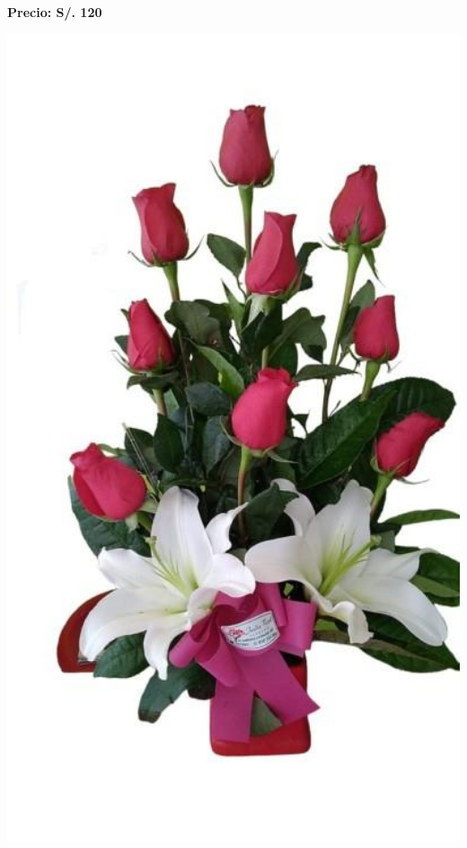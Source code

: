 \documentclass{article}
\begin{document}
\vspace{0.3cm}
\begin{center}
   \textbf{\Large Precio: \textcolor{cpred}{S/. 120 }}
\end{center}
\vspace{1cm}
\noindent
\begin{minipage}{0.35\textwidth}
    \includegraphics[width=1.0\textwidth]{imagenes_extraidas/image_9_5}
\end{minipage}
\hspace{1cm}
\end{document}
